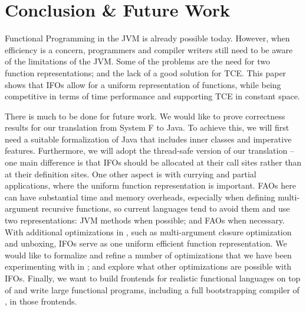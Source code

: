 \section{Conclusion \& Future Work}\label{sec:conclusion}
Functional Programming in the JVM is already possible today. 
However, when efficiency is a concern, programmers and compiler 
writers still need to be aware of the limitations of the JVM. 
Some of the problems are the need for two function representations; 
and the lack of a good solution for TCE. This paper shows that IFOs allow for a uniform representation of 
functions, while being competitive in terms of time performance and 
supporting TCE in constant space.

There is much to be done for future work. We would like to prove
correctness results for our translation from System F to Java. To
achieve this, we will first need a suitable formalization of Java that
includes inner classes and imperative features. Furthermore, we
will adopt the thread-safe version of our translation -- one main difference is that
IFOs should be allocated at their call sites rather than at their definition sites.
  One other aspect is with currying and partial applications,
where the uniform function representation is important.
FAOs here can have substantial time and memory overheads, especially when defining multi-argument
recursive functions, so current languages tend to avoid them and use two representations:
JVM methods when possible; and FAOs when necessary.
With additional optimizations in \Name, such as multi-argument closure optimization
and unboxing, IFOs serve as one uniform efficient function representation.
 We would like to formalize and refine a number of optimizations that we
have been experimenting with in \Name; and explore what other optimizations are possible
with IFOs.
Finally, we want to build frontends for
realistic functional languages on top of \name and write large
functional programs, including a full bootstrapping compiler of \Name, in those frontends.

